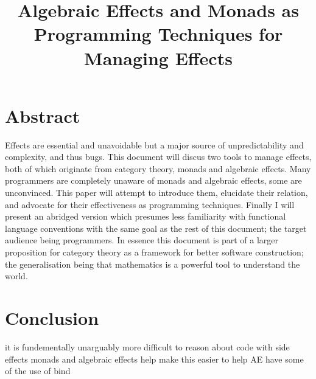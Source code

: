 \documentclass[a4paper,10pt]{article}
\title{Algebraic Effects and Monads as Programming Techniques for Managing Effects}
\theoremstyle{definition}
\begin{document}
\section{Abstract}

Effects are essential and unavoidable
but a major source of unpredictability
and complexity, and thus bugs.
This document will discus two tools to manage effects,
both of which originate from category theory,
monads and algebraic effects.
Many programmers are completely unaware of monads and algebraic effects,
some are unconvinced.
This paper will attempt to introduce them,
elucidate their relation,
and advocate for their effectiveness as programming techniques.
Finally I will present an abridged version
which presumes less familiarity with functional language conventions
with the same goal as the rest of this document;
the target audience being programmers.
In essence this document is part of a larger
proposition for category theory as a framework for better software construction;
the generalisation being that mathematics is a powerful tool to understand the world.

\pagebreak
\tableofcontents

\pagebreak


\pagebreak


\pagebreak


\pagebreak


\pagebreak


\pagebreak
\section{Conclusion}
it is fundementally unarguably more difficult to reason about code with side effects
monads and algebraic effects help make this easier
to help AE have some of the use of bind

\pagebreak
\appendix



\pagebreak


\end{document}
